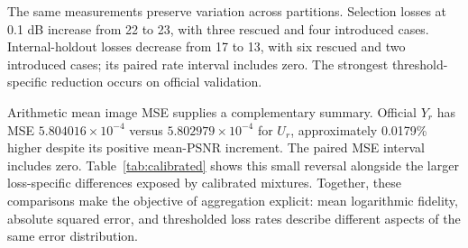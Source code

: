\documentclass[12pt]{article}
\begin{document}
The same measurements preserve variation across partitions. Selection losses at 0.1 dB increase from 22 to 23, with three rescued and four introduced cases. Internal-holdout losses decrease from 17 to 13, with six rescued and two introduced cases; its paired rate interval includes zero. The strongest threshold-specific reduction occurs on official validation.

Arithmetic mean image MSE supplies a complementary summary. Official $Y_r$ has MSE $5.804016\times10^{-4}$ versus $5.802979\times10^{-4}$ for $U_r$, approximately 0.0179\% higher despite its positive mean-PSNR increment. The paired MSE interval includes zero. Table~\ref{tab:calibrated} shows this small reversal alongside the larger loss-specific differences exposed by calibrated mixtures. Together, these comparisons make the objective of aggregation explicit: mean logarithmic fidelity, absolute squared error, and thresholded loss rates describe different aspects of the same error distribution.
\end{document}
